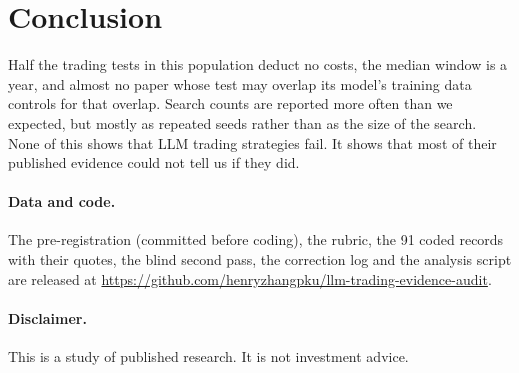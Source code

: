 \documentclass[11pt]{article}
\begin{document}
\section{Conclusion}

Half the trading tests in this population deduct no costs, the median window
is a year, and almost no paper whose test may overlap its model's training
data controls for that overlap. Search counts are reported more often than we
expected, but mostly as repeated seeds rather than as the size of the search.
None of this shows that LLM trading strategies fail. It shows that most of
their published evidence could not tell us if they did.

\paragraph{Data and code.} The pre-registration (committed before coding), the
rubric, the 91 coded records with their quotes, the blind second pass, the
correction log and the analysis script are released at
\url{https://github.com/henryzhangpku/llm-trading-evidence-audit}.

\aboutauthor

\paragraph{Disclaimer.} This is a study of published research. It is not
investment advice.
\end{document}
